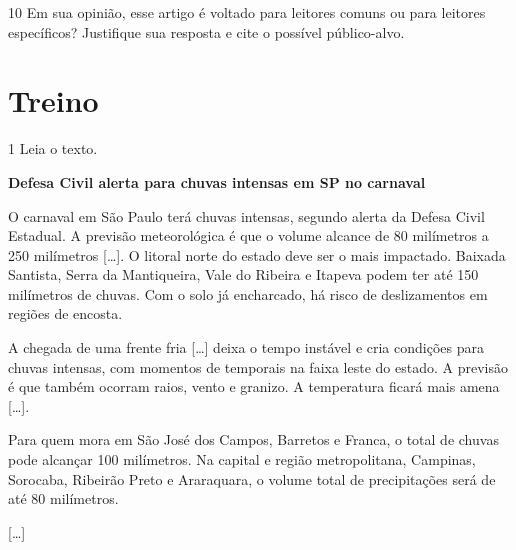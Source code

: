 \bigskip

\num{10} Em sua opinião, esse artigo é voltado para leitores comuns ou
para leitores específicos? Justifique sua resposta e cite o possível público-alvo.


\pagebreak

\section*{Treino}

\num{1} Leia o texto.

\begin{myquote}
\textbf{Defesa Civil alerta para chuvas intensas em SP no carnaval}


O carnaval em São Paulo terá chuvas intensas, segundo alerta da Defesa
Civil Estadual. A previsão meteorológica é que o volume alcance de 80
milímetros a 250 milímetros {[}\ldots{]}. O litoral norte do estado deve
ser o mais impactado. Baixada Santista, Serra da Mantiqueira, Vale do
Ribeira e Itapeva podem ter até 150 milímetros de chuvas. Com o solo já
encharcado, há risco de deslizamentos em regiões de encosta.

A chegada de uma frente fria {[}\ldots{]} deixa o tempo instável e cria
condições para chuvas intensas, com momentos de temporais na faixa leste
do estado. A previsão é que também ocorram raios, vento e granizo. A
temperatura ficará mais amena {[}\ldots{]}.

Para quem mora em São José dos Campos, Barretos e Franca, o total de
chuvas pode alcançar 100 milímetros. Na capital e região
metropolitana, Campinas, Sorocaba, Ribeirão Preto e Araraquara, o volume
total de precipitações será de até 80 milímetros.

{[}\ldots{]}

\end{myquote}

